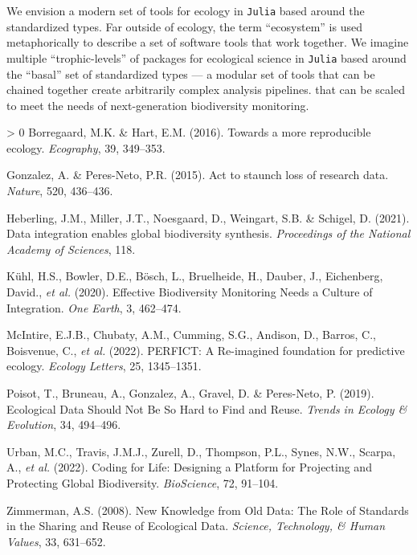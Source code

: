 \documentclass[11pt]{article}
\newlength{\cslhangindent}
\newenvironment{CSLReferences}[3] %
 {%
  \setlength{\parindent}{0pt}
  \ifodd #1 \everypar{\setlength{\hangindent}{\cslhangindent}}\ignorespaces\fi
  \ifnum #2 > 0
  \setlength{\parskip}{#2\baselineskip}
  \fi
 }%
 {}
\begin{document}
We envision a modern set of tools for ecology in \texttt{Julia} based
around the standardized types. Far outside of ecology, the term
``ecosystem'' is used metaphorically to describe a set of software tools
that work together. We imagine multiple ``trophic-levels'' of packages
for ecological science in \texttt{Julia} based around the ``basal'' set
of standardized types --- a modular set of tools that can be chained
together create arbitrarily complex analysis pipelines. that can be
scaled to meet the needs of next-generation biodiversity monitoring.

\hypertarget{refs}{}
\begin{CSLReferences}{1}{0}
\leavevmode\hypertarget{ref-Borregaard2016MorRep}{}%
Borregaard, M.K. \& Hart, E.M. (2016). Towards a more reproducible
ecology. \emph{Ecography}, 39, 349--353.

\leavevmode\hypertarget{ref-Gonzalez2015ActSta}{}%
Gonzalez, A. \& Peres-Neto, P.R. (2015). Act to staunch loss of research
data. \emph{Nature}, 520, 436--436.

\leavevmode\hypertarget{ref-Heberling2021DatInt}{}%
Heberling, J.M., Miller, J.T., Noesgaard, D., Weingart, S.B. \& Schigel,
D. (2021). Data integration enables global biodiversity synthesis.
\emph{Proceedings of the National Academy of Sciences}, 118.

\leavevmode\hypertarget{ref-Kuhl2020EffBio}{}%
Kühl, H.S., Bowler, D.E., Bösch, L., Bruelheide, H., Dauber, J.,
Eichenberg, David., \emph{et al.} (2020). Effective Biodiversity
Monitoring Needs a Culture of Integration. \emph{One Earth}, 3,
462--474.

\leavevmode\hypertarget{ref-McIntire2022PerRei}{}%
McIntire, E.J.B., Chubaty, A.M., Cumming, S.G., Andison, D., Barros, C.,
Boisvenue, C., \emph{et al.} (2022). PERFICT: A Re-imagined foundation
for predictive ecology. \emph{Ecology Letters}, 25, 1345--1351.

\leavevmode\hypertarget{ref-Poisot2019EcoDat}{}%
Poisot, T., Bruneau, A., Gonzalez, A., Gravel, D. \& Peres-Neto, P.
(2019). Ecological Data Should Not Be So Hard to Find and Reuse.
\emph{Trends in Ecology \& Evolution}, 34, 494--496.

\leavevmode\hypertarget{ref-Urban2022CodLif}{}%
Urban, M.C., Travis, J.M.J., Zurell, D., Thompson, P.L., Synes, N.W.,
Scarpa, A., \emph{et al.} (2022). Coding for Life: Designing a Platform
for Projecting and Protecting Global Biodiversity. \emph{BioScience},
72, 91--104.

\leavevmode\hypertarget{ref-Zimmerman2008NewKno}{}%
Zimmerman, A.S. (2008). New Knowledge from Old Data: The Role of
Standards in the Sharing and Reuse of Ecological Data. \emph{Science,
Technology, \& Human Values}, 33, 631--652.

\end{CSLReferences}
\end{document}
